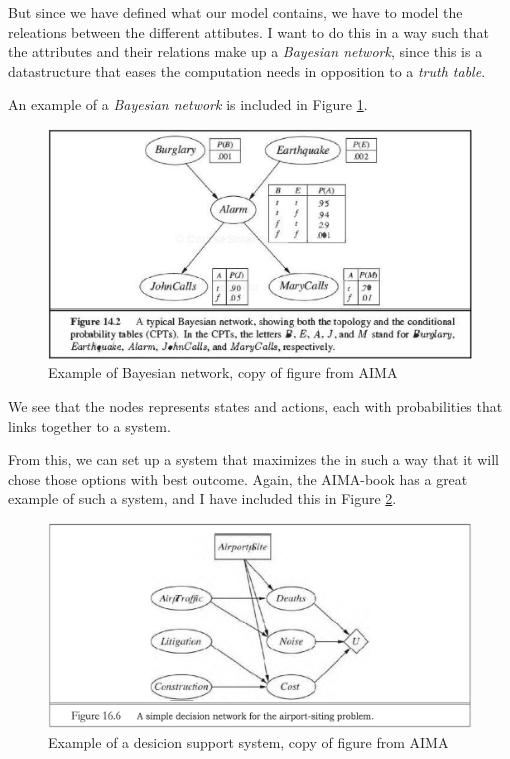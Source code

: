 But since we have defined what our model contains, we have to model the
releations between the different attibutes. I want to do this in a way such that
the attributes and their relations make up a \emph{Bayesian network}, since this is a datastructure that eases the
computation needs in opposition to a  \emph{truth table}\cite{aima}.

An example of a \emph{Bayesian network} is included in
Figure \ref{fig:BayExample}.
\begin{figure}[h]
\includegraphics[width=154mm]{figure-example1.png}
\caption{Example of Bayesian network, copy of figure from AIMA\cite{aima}}
\label{fig:BayExample}
\end{figure}
We see that the nodes represents states and actions, each with probabilities
that links together to a system.

From this, we can set up a system that maximizes the \cite{aima} in such a way that it will chose those options with best
outcome. Again, the AIMA-book has a great example of such a system, and I have
included this in Figure \ref{fig:dssExample}. \begin{figure}[h]
\includegraphics[width=154mm]{figure-example2.png}
\caption{Example of a desicion support system, copy of figure from
AIMA\cite{aima}}
\label{fig:dssExample}
\end{figure}

